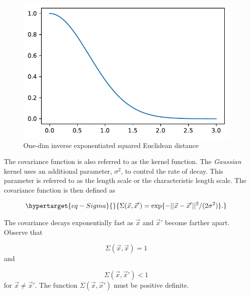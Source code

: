 \documentclass[
  letterpaper,
  DIV=11,
  numbers=noendperiod]{scrreprt}
\begin{document}
\begin{figure}[H]

{\centering \includegraphics{006_num_gp_files/figure-pdf/fig-exp2euclid-output-1.pdf}

}

\caption{\label{fig-exp2euclid}One-dim inverse exponentiated squared
Euclidean distance}

\end{figure}

The covariance function is also referred to as the kernel function. The
\emph{Gaussian} kernel uses an additional parameter, \(\sigma^2\), to
control the rate of decay. This parameter is referred to as the length
scale or the characteristic length scale. The covariance function is
then defined as

\begin{equation}\protect\hypertarget{eq-Sigma}{}{
\Sigma(\vec{x}, \vec{x}') = \exp\{ - || \vec{x} - \vec{x}'||^2 / (2 \sigma^2) \}.
}\label{eq-Sigma}\end{equation}

The covariance decays exponentially fast as \(\vec{x}\) and \(\vec{x}'\)
become farther apart. Observe that

\[
\Sigma(\vec{x},\vec{x}) = 1
\] and

\[
\Sigma(\vec{x}, \vec{x}') < 1
\] for \(\vec{x} \neq \vec{x}'\). The function
\(\Sigma(\vec{x},\vec{x}')\) must be positive definite.
\end{document}
